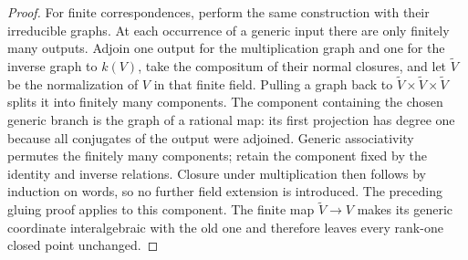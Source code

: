 \documentclass[11pt,oneside]{article}
\theoremstyle{definition}
\theoremstyle{remark}
\begin{document}
\begin{proof}
For finite correspondences, perform the same construction with their irreducible graphs.
At each occurrence of a generic input there are only finitely many outputs.  Adjoin one
output for the multiplication graph and one for the inverse graph to $k(V)$, take the
compositum of their normal closures, and let $\widetilde V$ be the normalization of $V$
in that finite field.  Pulling a graph back to
$\widetilde V\times\widetilde V\times\widetilde V$ splits it into finitely many
components.  The component containing the chosen generic branch is the graph of a
rational map: its first projection has degree one because all conjugates of the output
were adjoined.  Generic associativity permutes the finitely many components; retain the
component fixed by the identity and inverse relations.  Closure under multiplication
then follows by induction on words, so no further field extension is introduced.  The
preceding gluing proof applies to this component.  The finite map
$\widetilde V\to V$ makes its generic coordinate interalgebraic with the old one and
therefore leaves every rank-one closed point unchanged.
\end{proof}
\end{document}

